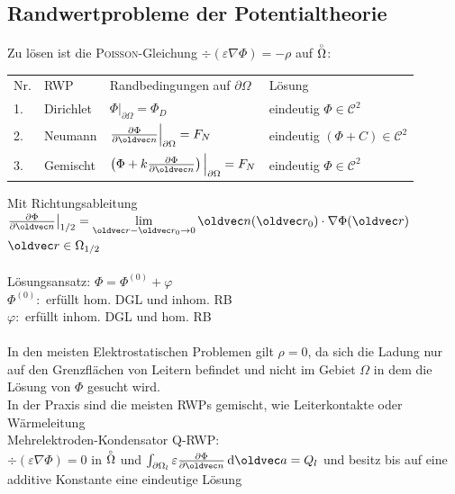 \documentclass[6pt,a4paper]{scrartcl}
\let\vec\oldvec
\begin{document}
\begin{multicols}{4}
	\subsection{Randwertprobleme der Potentialtheorie}
	Zu lösen ist die \textsc{Poisson}-Gleichung $\div(\varepsilon \nabla \Phi) = -\rho$ auf $\overset{{}_\circ}{\Omega}$:\\
	\begin{tabular*}{\columnwidth}{@{\extracolsep\fill}llll@{}}
	Nr. & RWP & Randbedingungen auf $\partial \Omega$ & Lösung\\
	1. & Dirichlet & $\Phi\big|_{\partial\Omega} = \Phi_D$ & eindeutig $\Phi \in \mathcal C^2$\\[0.5em]
	2. & Neumann & $\frac{\partial \Phi}{\partial \vec n}\Big|_{\partial\Omega} = F_N$ & eindeutig $(\Phi + C) \in \mathcal C^2$\\[0.5em]
	3. & Gemischt & $\left( \Phi + k \frac{\partial \Phi}{\partial \vec n}\right)\Big|_{\partial\Omega} = F_N$ & eindeutig $\Phi \in \mathcal C^2$\\
	\end{tabular*} 
	Mit Richtungsableitung $\frac{\partial \Phi}{\partial \vec n}\big|_{1/2} = \lim\limits_{\vec r - \vec r_0 \ra 0} \vec n(\vec r_0) \cdot \nabla\Phi(\vec r)$ \quad $\vec r \in \Omega_{1/2}$\\
	\\
	Lösungsansatz: $\Phi = \Phi^{(0)} + \varphi$\\
	$\Phi^{(0)}:$ erfüllt hom. DGL und inhom. RB\\
	$\varphi:$ erfüllt inhom. DGL und hom. RB\\
	\\
	In den meisten Elektrostatischen Problemen gilt $\rho = 0$, da sich die Ladung nur auf den Grenzflächen von Leitern befindet und nicht im Gebiet $\Omega$ in dem die Lösung von $\Phi$ gesucht wird.\\
	In der Praxis sind die meisten RWPs gemischt, wie Leiterkontakte oder Wärmeleitung\\ 
	
	Mehrelektroden-Kondensator Q-RWP:\\
	$\div(\varepsilon \nabla \Phi) = 0$ in $\overset{{}_\circ}{\Omega}$ und $\int_{\partial \Omega_l} \varepsilon \frac{\partial \Phi}{\partial \vec n} \diff \vec a = Q_l$ und  besitz bis auf eine additive Konstante eine eindeutige Lösung
	

\end{multicols}
\end{document}
